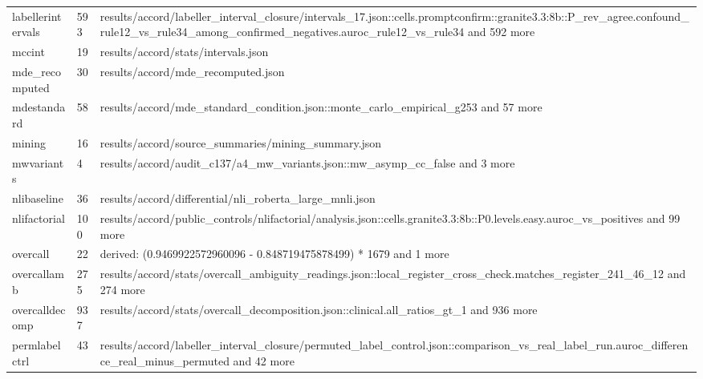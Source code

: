 \begin{longtable}{@{}p{1.6in}p{0.6in}p{3.6in}@{}}
labellerintervals & 593 & results/\allowbreak{}accord/\allowbreak{}labeller\_interval\_closure/\allowbreak{}intervals\_17.\allowbreak{}json::cells.\allowbreak{}promptconfirm::granite3.\allowbreak{}3:8b::P\_rev\_agree.\allowbreak{}confound\_rule12\_vs\_rule34\_among\_confirmed\_negatives.\allowbreak{}auroc\_rule12\_vs\_rule34 and 592 more\\
mccint & 19 & results/\allowbreak{}accord/\allowbreak{}stats/\allowbreak{}intervals.\allowbreak{}json\\
mde\_recomputed & 30 & results/\allowbreak{}accord/\allowbreak{}mde\_recomputed.\allowbreak{}json\\
mdestandard & 58 & results/\allowbreak{}accord/\allowbreak{}mde\_standard\_condition.\allowbreak{}json::monte\_carlo\_empirical\_g253 and 57 more\\
mining & 16 & results/\allowbreak{}accord/\allowbreak{}source\_summaries/\allowbreak{}mining\_summary.\allowbreak{}json\\
mwvariants & 4 & results/\allowbreak{}accord/\allowbreak{}audit\_c137/\allowbreak{}a4\_mw\_variants.\allowbreak{}json::mw\_asymp\_cc\_false and 3 more\\
nlibaseline & 36 & results/\allowbreak{}accord/\allowbreak{}differential/\allowbreak{}nli\_roberta\_large\_mnli.\allowbreak{}json\\
nlifactorial & 100 & results/\allowbreak{}accord/\allowbreak{}public\_controls/\allowbreak{}nlifactorial/\allowbreak{}analysis.\allowbreak{}json::cells.\allowbreak{}granite3.\allowbreak{}3:8b::P0.\allowbreak{}levels.\allowbreak{}easy.\allowbreak{}auroc\_vs\_positives and 99 more\\
overcall & 22 & derived: (0.\allowbreak{}9469922572960096 - 0.\allowbreak{}848719475878499) * 1679 and 1 more\\
overcallamb & 275 & results/\allowbreak{}accord/\allowbreak{}stats/\allowbreak{}overcall\_ambiguity\_readings.\allowbreak{}json::local\_register\_cross\_check.\allowbreak{}matches\_register\_241\_46\_12 and 274 more\\
overcalldecomp & 937 & results/\allowbreak{}accord/\allowbreak{}stats/\allowbreak{}overcall\_decomposition.\allowbreak{}json::clinical.\allowbreak{}all\_ratios\_gt\_1 and 936 more\\
permlabelctrl & 43 & results/\allowbreak{}accord/\allowbreak{}labeller\_interval\_closure/\allowbreak{}permuted\_label\_control.\allowbreak{}json::comparison\_vs\_real\_label\_run.\allowbreak{}auroc\_difference\_real\_minus\_permuted and 42 more\\

\end{longtable}
